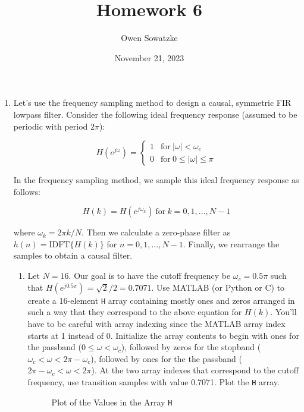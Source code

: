 \documentclass[fleqn]{article}
\title{Homework 6}
\author{Owen Sowatzke}
\date{November 21, 2023}
\makeatletter
\newcommand{\zerodisplayskip}{
	\setlength{\abovedisplayskip}{0pt}%
	\setlength{\belowdisplayskip}{0pt}%
	\setlength{\abovedisplayshortskip}{0pt}%
	\setlength{\belowdisplayshortskip}{0pt}%
	\setlength{\mathindent}{0pt}}
\newenvironment{equationCenter}{\@fleqnfalse\begin{equation*}}{\end{equation*}}
\makeatother
\begin{document}
	\offinterlineskip
	\setlength{\lineskip}{12pt}
	\zerodisplayskip
	\maketitle
	\begin{enumerate}
		\item Let's use the frequency sampling method to design a causal, symmetric FIR lowpass filter. Consider the following ideal frequency response (assumed to be periodic with period $2\pi$):
		
		\begin{equationCenter}
			H(e^{j\omega}) = \begin{cases}
				1 & \text{for}\ |\omega| < \omega_c\\
				0 & \text{for}\ 0 \leq |\omega| \leq \pi
			\end{cases}
		\end{equationCenter}
		
		In the frequency sampling method, we sample this ideal frequency response as follows:
		
		\begin{equationCenter}
			H(k) = H(e^{j\omega_k})\ \text{for}\ k = 0,1,...,N-1
		\end{equationCenter}
		
		where $\omega_k = 2{\pi}k/N$. Then we calculate a zero-phase filter as $h(n) = \text{IDFT}\{H(k)\}$ for $n = 0,1,...,N-1$. Finally, we rearrange the samples to obtain a causal filter.
		
		\begin{enumerate}[nolistsep]
			\item Let $N = 16$. Our goal is to have the cutoff frequency be $\omega_c = 0.5\pi$ such that $H(e^{j0.5\pi}) = \sqrt{2}/2 = 0.7071$. Use MATLAB (or Python or C) to create a 16-element \texttt{H} array containing mostly ones and zeros arranged in such a way that they correspond to the above equation for $H(k)$. You'll have to be careful with array indexing since the MATLAB array index starts at 1 instead of 0. Initialize the array contents to begin with ones for the passband ($0 \leq \omega < \omega_c$), followed by zeros for the stopband ($\omega_c < \omega < 2\pi - \omega_c$), followed by ones for the the passband ($2\pi - \omega_c < \omega < 2\pi$). At the two array indexes that correspond to the cutoff frequency, use transition samples with value 0.7071. Plot the \texttt{H} array.
			
			\begin{figure}[H]
				\centerline{}
				\caption{Plot of the Values in the Array \texttt{H}}
			\end{figure}
			

\end{enumerate}
\end{enumerate}
\end{document}
